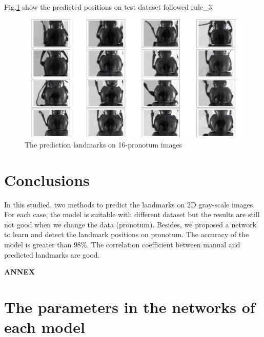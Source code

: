 \documentclass[12pt,a4paper]{article}
\begin{document}
Fig.\ref{cnn3t} show the predicted positions on test dataset followed rule\_3:
\begin{figure}[h!]
	\centering
	\includegraphics[scale=0.2]{images/figure_1_cnn3_5000_v13}
	\caption{The prediction landmarks on 16-pronotum images}
	\label{cnn3t}
\end{figure}
\section{Conclusions}
In this studied, two methods to predict the landmarks on 2D gray-scale images. For each case, the model is suitable with different dataset but the results are still not good when we change the data (pronotum). Besides, we proposed a network to learn and detect the landmark positions on pronotum. The accuracy of the model is greater than $98 \%$. The correlation coefficient between manual and predicted landmarks are good.



\pagebreak
\appendix
\begin{center}
\LARGE \textbf{ANNEX}
\end{center}
\section{The parameters in the networks of each model}
\end{document}
